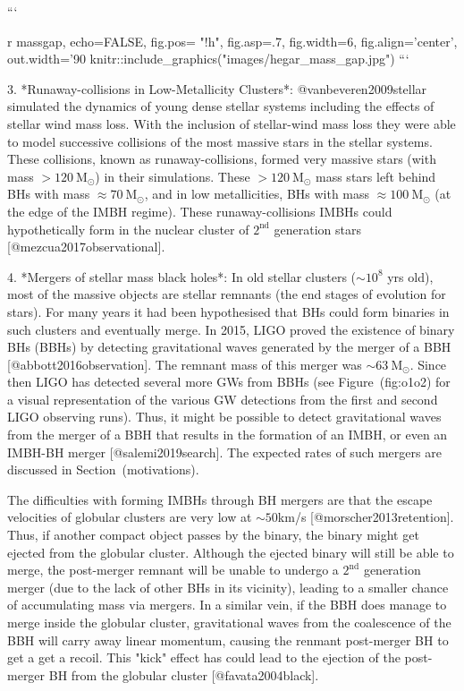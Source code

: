 {```{r massgap, echo=FALSE, fig.pos= "!h", fig.asp=.7, fig.width=6, fig.align='center', out.width='90%
knitr::include_graphics("images/hegar_mass_gap.jpg")
```

3. *Runaway-collisions in Low-Metallicity Clusters*:
   @vanbeveren2009stellar simulated the dynamics of young dense stellar
   systems including the effects of stellar wind mass loss. With the
   inclusion of stellar-wind mass loss they were able to model
   successive collisions of the most massive stars in the stellar
   systems. These collisions, known as runaway-collisions, formed very
   massive stars (with mass $> 120 \ \text{M}_{\odot}$) in their
   simulations. These $> 120 \ \text{M}_{\odot}$ mass stars left behind
   BHs with mass $\approx 70\ \text{M}_{\odot}$, and in low metallicities,
   BHs with mass $\approx 100\ \text{M}_{\odot}$ (at the edge of the IMBH
   regime). These runaway-collisions IMBHs could hypothetically form in
   the nuclear cluster of $2^\text{nd}$ generation stars
   [@mezcua2017observational].


4. *Mergers of stellar mass black holes*:
    In old stellar clusters ($\sim10^8$ yrs old), most of the massive
    objects are stellar remnants (the end stages of evolution for
    stars). For many years it had been hypothesised that BHs could form
    binaries in such clusters and eventually merge. In 2015, LIGO proved
    the existence of binary BHs (BBHs) by detecting gravitational waves
    generated by the merger of a BBH [@abbott2016observation]. The
    remnant mass of this merger was $\sim63\ \text{M}_{\odot}$. Since
    then LIGO has detected several more GWs from BBHs (see
    Figure~\@ref(fig:o1o2) for a visual representation of the various GW
    detections from the first and second LIGO observing runs). Thus, it
    might be possible to detect gravitational waves from the merger of a
    BBH that results in the formation of an IMBH, or even an IMBH-BH
    merger [@salemi2019search]. The expected rates of such mergers are
    discussed in Section~\@ref(motivations).

    The difficulties with forming IMBHs through BH mergers are that the
    escape velocities of globular clusters are very low at $\sim50$km/s
    [@morscher2013retention]. Thus, if another compact object passes by
    the binary, the binary might get ejected from the globular cluster.
    Although the ejected binary will still be able to merge, the
    post-merger remnant will be unable to undergo a $2^{\text{nd}}$
    generation merger (due to the lack of other BHs in its vicinity),
    leading to a smaller chance of accumulating mass via mergers.  In a
    similar vein, if the BBH does manage to merge inside the globular
    cluster, gravitational waves from the coalescence of the BBH  will
    carry away linear momentum, causing the renmant post-merger BH to
    get a get a recoil. This "kick" effect has could lead to the
    ejection of the post-merger BH from the globular cluster
    [@favata2004black].

}}
